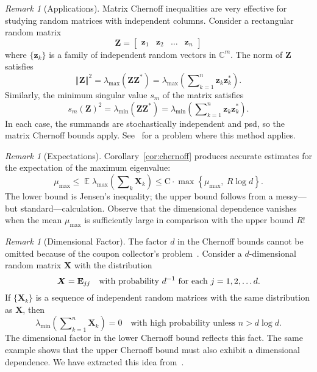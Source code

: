 \documentclass[11pt,letterpaper,twoside,reqno,draft]{amsart}
\theoremstyle{remark}
\newtheorem{rem}[thm]{Remark}
\numberwithin{equation}{section}
\numberwithin{thm}{section}
\begin{document}
\begin{rem}[Applications]
Matrix Chernoff inequalities are very effective for studying random matrices with independent columns.  Consider a rectangular random matrix
$$
{\bm{{Z}}} = \begin{bmatrix} {\bm{{z}}}_1 & {\bm{{z}}}_2 & \dots & {\bm{{z}}}_n \end{bmatrix}
$$
where $\{ {\bm{{z}}}_k \}$ is a family of independent random vectors in $\mathbb{C}^m$.
The norm of ${\bm{{Z}}}$ satisfies
$$
{\left\Vert {{ {\bm{{Z}}} }} \right\Vert}^2 = \lambda_{\max}( {\bm{{ZZ}}}^{*} )
	= \lambda_{\max}\left( \sum\nolimits_{k=1}^n {\bm{{z}}}_k {\bm{{z}}}_k^{*} \right).
$$
Similarly, the minimum singular value $s_m$ of the matrix satisfies
$$
s_{m}( {\bm{{Z}}} )^2 = \lambda_{\min}( {\bm{{ZZ}}}^{*} )
	= \lambda_{\min}\left( \sum\nolimits_{k=1}^n {\bm{{z}}}_k {\bm{{z}}}_k^{*} \right).
$$
In each case, the summands are stochastically independent and psd, so the matrix Chernoff bounds apply.  See~\cite{Tro10:Improved-Analysis} for a problem where this method applies.
\end{rem}

\begin{rem}[Expectations]
Corollary~\ref{cor:chernoff} produces accurate estimates for the expectation of the maximum eigenvalue:
$$
\mu_{\max} \leq {\operatorname{\mathbb{E}}} \lambda_{\max}\left(\sum\nolimits_k {\bm{{X}}}_k \right)
	\leq {\mathrm{{C}}} \cdot \max\left\{ \mu_{\max},\ R \log d \right\}.
$$
The lower bound is Jensen's inequality; the upper bound follows from a messy---but standard---calculation.  Observe that the dimensional dependence vanishes when the mean $\mu_{\max}$ is sufficiently large in comparison with the upper bound $R$!
\end{rem}

\begin{rem}[Dimensional Factor]
The factor $d$ in the Chernoff bounds cannot be omitted because of the coupon collector's problem~\cite[\S3.6]{MR95:Randomized-Algorithms}.  Consider a $d$-dimensional random matrix ${\bm{{X}}}$ with the distribution
$$
{\bm{{X}}} = {\bf E}_{jj} \quad\text{with probability $d^{-1}$ for each $j = 1, 2, \dots d$.}
$$
If $\{{\bm{{X}}}_k\}$ is a sequence of independent random matrices with the same distribution as ${\bm{{X}}}$, then
$$
\lambda_{\min}\left(\sum\nolimits_{k=1}^n {\bm{{X}}}_k \right)
	= 0
\quad\text{with high probability unless $n > d\log d$.}
$$
The dimensional factor in the lower Chernoff bound reflects this fact.  The same example shows that the upper Chernoff bound must also exhibit a dimensional dependence.  We have extracted this idea from~\cite[Sec.~3.5]{RV07:Sampling-Large}.
\end{rem}
\end{document}
